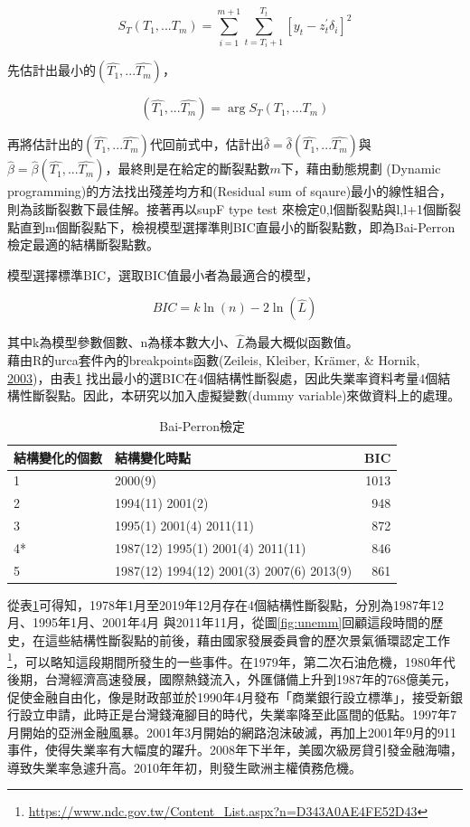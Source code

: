 \documentclass[oneside]{book}
\begin{document}
\[S_T(T_1,...T_m)=\sum\limits_{i=1}^{m+1}\sum\limits_{t=T_i+1}^{T_t}[y_t-z_t^{'}\delta_i]^2\]

先估計出最小的\((\hat{T_1},...\hat{T_m})\)，

\[(\hat{T_1},...\hat{T_m}) =\mathop{\arg\min_{T_1,...T_m}} S_T(T_1,...T_m)\]

再將估計出的\((\hat{T_1},...\hat{T_m})\)代回前式中，估計出\(\hat{\delta}=\hat{\delta}(\hat{T_1},...\hat{T_m})\)與\(\hat{\beta}=\hat{\beta}(\hat{T_1},...\hat{T_m})\)，最終則是在給定的斷裂點數\(m\)下，藉由動態規劃 (Dynamic programming)的方法找出殘差均方和(Residual sum of sqaure)最小的線性組合，則為該斷裂數下最佳解。接著再以supF type test 來檢定0,l個斷裂點與l,l+1個斷裂點直到m個斷裂點下，檢視模型選擇準則BIC直最小的斷裂點數，即為Bai-Perron檢定最適的結構斷裂點數。

模型選擇標準BIC，選取BIC值最小者為最適合的模型，

\[BIC = k\ln(n)-2\ln(\hat L)\]

其中k為模型參數個數、n為樣本數大小、\(\hat L\)為最大概似函數值。\\
藉由R的urca套件內的breakpoints函數(Zeileis, Kleiber, Krämer, \& Hornik, \protect\hyperlink{ref-zeileisTestingDatingStructural2003}{2003})，由表\ref{tab:BP} 找出最小的選BIC在4個結構性斷裂處，因此失業率資料考量4個結構性斷裂點。因此，本研究以加入虛擬變數(dummy variable)來做資料上的處理。

\begin{table}

\caption{\label{tab:BP}Bai-Perron檢定}
\centering
\begin{tabular}[t]{l|l|r}
\hline
結構變化的個數 & 結構變化時點 & BIC\\
\hline
1 & 2000(9) & 1013\\
\hline
2 & 1994(11) 2001(2) & 948\\
\hline
3 & 1995(1) 2001(4) 2011(11) & 872\\
\hline
4* & 1987(12) 1995(1) 2001(4) 2011(11) & 846\\
\hline
5 & 1987(12) 1994(12) 2001(3) 2007(6) 2013(9) & 861\\
\hline
\end{tabular}
\end{table}

從表\ref{tab:BP}可得知，1978年1月至2019年12月存在4個結構性斷裂點，分別為1987年12月、1995年1月、2001年4月 與2011年11月，從圖\ref{fig:unemm}回顧這段時間的歷史，在這些結構性斷裂點的前後，藉由國家發展委員會的歷次景氣循環認定工作\footnote{\url{https://www.ndc.gov.tw/Content_List.aspx?n=D343A0AE4FE52D43}}，可以略知這段期間所發生的一些事件。在1979年，第二次石油危機，1980年代後期，台灣經濟高速發展，國際熱錢流入，外匯儲備上升到1987年的768億美元，促使金融自由化，像是財政部並於1990年4月發布「商業銀行設立標準」，接受新銀行設立申請，此時正是台灣錢淹腳目的時代，失業率降至此區間的低點。1997年7月開始的亞洲金融風暴。2001年3月開始的網路泡沫破滅，再加上2001年9月的911事件，使得失業率有大幅度的躍升。2008年下半年，美國次級房貸引發金融海嘯，導致失業率急遽升高。2010年年初，則發生歐洲主權債務危機。
\end{document}

